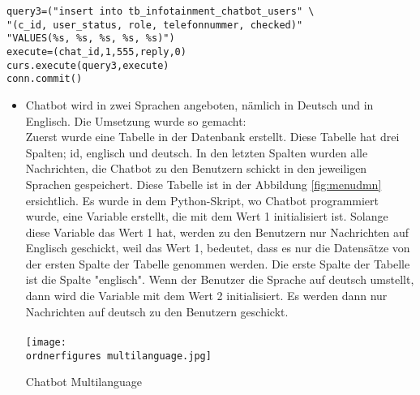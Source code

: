 \begin{lstlisting}[frame=single] 
query3=("insert into tb_infotainment_chatbot_users" \
"(c_id, user_status, role, telefonnummer, checked)"
"VALUES(%s, %s, %s, %s, %s)")
execute=(chat_id,1,555,reply,0)
curs.execute(query3,execute)
conn.commit()
\end{lstlisting}
\begin{itemize}
	\item Chatbot wird in zwei Sprachen angeboten, n\"amlich in Deutsch und in Englisch. Die Umsetzung wurde so gemacht: \\
		Zuerst wurde eine Tabelle in der Datenbank erstellt. Diese Tabelle hat drei Spalten; id, englisch und deutsch. In den letzten Spalten wurden alle Nachrichten, die Chatbot zu den Benutzern schickt in den jeweiligen Sprachen gespeichert.	Diese Tabelle ist in der Abbildung \ref{fig:menudmn} ersichtlich. 
		Es wurde in dem Python-Skript, wo Chatbot programmiert wurde, eine Variable erstellt, die mit dem Wert 1 initialisiert ist. Solange diese Variable das Wert 1 hat, werden zu den Benutzern nur Nachrichten auf Englisch geschickt, weil das Wert 1, bedeutet, dass es nur die Datens\"atze von der ersten Spalte der Tabelle genommen werden. Die erste Spalte der Tabelle ist die Spalte "englisch". Wenn der Benutzer die Sprache auf deutsch umstellt, dann wird die Variable mit dem Wert 2 initialisiert. Es werden dann nur Nachrichten auf deutsch zu den Benutzern geschickt. \\
		\\
		\captionsetup{type=figure}
		\texttt{[image: \\ordnerfigures multilanguage.jpg]}
		\caption{Chatbot Multilanguage} 
		\label{fig:menudmn}
\end{itemize}
